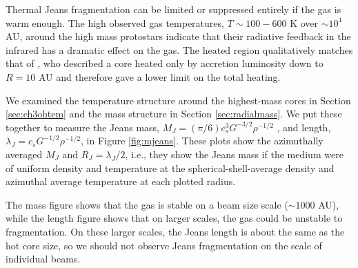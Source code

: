 \documentclass{emulateapj}
\begin{document}
Thermal Jeans fragmentation can be limited or suppressed entirely if the gas is
warm enough.  The high observed gas temperatures, $T\sim100-600$ K over
$\sim10^4$ AU, around the high mass protostars indicate that their radiative
feedback in the infrared has a dramatic effect on the gas.  The heated region
qualitatively matches that of \citet{Krumholz2006a}, who described
a core heated only by accretion luminosity down to $R=10$ AU and therefore
gave a lower limit on the total heating. 

We examined the temperature structure around the highest-mass cores in Section
\ref{sec:ch3ohtem} and the mass structure in Section \ref{sec:radialmass}.  We
put these together to measure the Jeans mass, $M_J = (\pi / 6) c_s^3
G^{-3/2} \rho^{-1/2}$
, and length, $\lambda_J = c_s G^{-1/2} \rho^{-1/2}$, 
in
Figure \ref{fig:mjeans}.  These plots show the azimuthally averaged $M_J$
and $R_J=\lambda_J/2$,
i.e., they show the Jeans mass if the medium
were of uniform density and temperature at the spherical-shell-average density
and azimuthal average temperature at each plotted radius.

The mass figure shows that the gas is stable on a beam size scale ($\sim1000$
AU), while the length figure shows that on larger scales, the gas could be
unstable to fragmentation.  On these larger scales, the Jeans length is about
the same as the hot core size, so we should not observe Jeans fragmentation on
the scale of individual beams.


\end{document}
